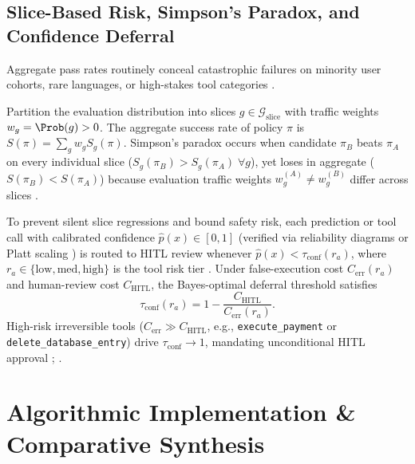 \documentclass[../../../../master.tex]{subfiles}
\begin{document}
\subsection{Slice-Based Risk, Simpson's Paradox, and Confidence Deferral}
\label{sec:ops:slicing_math}

Aggregate pass rates routinely conceal catastrophic failures on minority user cohorts, rare languages, or high-stakes tool categories .

\begin{coremath}
Partition the evaluation distribution into slices $g \in \mathcal{G}_{\mathrm{slice}}$ with traffic weights $w_g = \Prob(g) > 0$. The aggregate success rate of policy $\pi$ is $S(\pi) = \sum_g w_g S_g(\pi)$. Simpson's paradox occurs when candidate $\pi_B$ beats $\pi_A$ on every individual slice ($S_g(\pi_B) > S_g(\pi_A)\;\forall g$), yet loses in aggregate ($S(\pi_B) < S(\pi_A)$) because evaluation traffic weights $w_g^{(A)} \neq w_g^{(B)}$ differ across slices .

To prevent silent slice regressions and bound safety risk, each prediction or tool call with calibrated confidence $\hat{p}(x) \in [0,1]$ (verified via reliability diagrams or Platt scaling ) is routed to HITL review whenever $\hat{p}(x) < \tau_{\mathrm{conf}}(r_a)$, where $r_a \in \{\mathrm{low}, \mathrm{med}, \mathrm{high}\}$ is the tool risk tier . Under false-execution cost $C_{\mathrm{err}}(r_a)$ and human-review cost $C_{\mathrm{HITL}}$, the Bayes-optimal deferral threshold satisfies
\begin{equation}
  \tau_{\mathrm{conf}}(r_a) = 1 - \frac{C_{\mathrm{HITL}}}{C_{\mathrm{err}}(r_a)}.
  \label{eq:ops:deferral_threshold}
\end{equation}
High-risk irreversible tools ($C_{\mathrm{err}} \gg C_{\mathrm{HITL}}$, e.g., \texttt{execute\_payment} or \texttt{delete\_database\_entry}) drive $\tau_{\mathrm{conf}} \to 1$, mandating unconditional HITL approval ; .
\end{coremath}

\section{Algorithmic Implementation \& Comparative Synthesis}
\label{sec:ops:algorithms}
\end{document}

